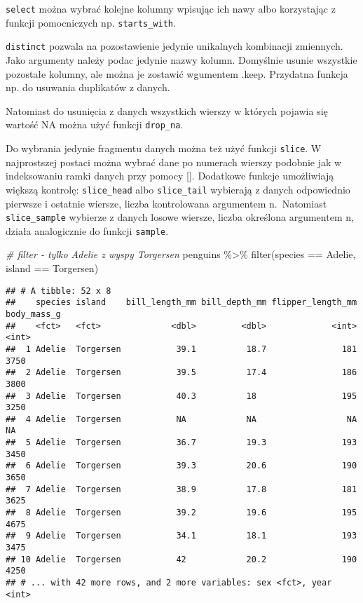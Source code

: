 \documentclass[
]{book}
\newenvironment{Shaded}{\begin{snugshade}}{\end{snugshade}}
\newcommand{\CommentTok}[1]{\textcolor[rgb]{0.56,0.35,0.01}{\textit{#1}}}
\newcommand{\FunctionTok}[1]{\textcolor[rgb]{0.00,0.00,0.00}{#1}}
\newcommand{\NormalTok}[1]{#1}
\newcommand{\SpecialCharTok}[1]{\textcolor[rgb]{0.00,0.00,0.00}{#1}}
\newcommand{\StringTok}[1]{\textcolor[rgb]{0.31,0.60,0.02}{#1}}
\begin{document}
\texttt{select} można wybrać kolejne kolumny wpisując ich nawy albo korzystając z funkcji pomocniczych np. \texttt{starts\_with}.

\texttt{distinct} pozwala na pozostawienie jedynie unikalnych kombinacji zmiennych. Jako argumenty należy podac jedynie nazwy kolumn. Domyślnie usunie wszystkie pozostałe kolumny, ale można je zostawić wgumentem .keep. Przydatna funkcja np. do usuwania duplikatów z danych.

Natomiast do usunięcia z danych wszystkich wierszy w których pojawia się wartość NA można użyć funkcji \texttt{drop\_na}.

Do wybrania jedynie fragmentu danych można też użyć funkcji \texttt{slice}. W najprostszej postaci można wybrać dane po numerach wierszy podobnie jak w indeksowaniu ramki danych przy pomocy {[}{]}. Dodatkowe funkcje umożliwiają większą kontrolę: \texttt{slice\_head} albo \texttt{slice\_tail} wybierają z danych odpowiednio pierwsze i ostatnie wiersze, liczba kontrolowana argumentem n.~Natomiast \texttt{slice\_sample} wybierze z danych losowe wiersze, liczba określona argumentem n, działa analogicznie do funkcji \texttt{sample}.

\begin{Shaded}
\begin{Highlighting}[]
\CommentTok{\# filter {-} tylko Adelie z wyspy Torgersen}
\NormalTok{penguins }\SpecialCharTok{\%\textgreater{}\%} \FunctionTok{filter}\NormalTok{(species }\SpecialCharTok{==} \StringTok{\textquotesingle{}Adelie\textquotesingle{}}\NormalTok{, island }\SpecialCharTok{==} \StringTok{\textquotesingle{}Torgersen\textquotesingle{}}\NormalTok{)}
\end{Highlighting}
\end{Shaded}

\begin{verbatim}
## # A tibble: 52 x 8
##    species island    bill_length_mm bill_depth_mm flipper_length_mm body_mass_g
##    <fct>   <fct>              <dbl>         <dbl>             <int>       <int>
##  1 Adelie  Torgersen           39.1          18.7               181        3750
##  2 Adelie  Torgersen           39.5          17.4               186        3800
##  3 Adelie  Torgersen           40.3          18                 195        3250
##  4 Adelie  Torgersen           NA            NA                  NA          NA
##  5 Adelie  Torgersen           36.7          19.3               193        3450
##  6 Adelie  Torgersen           39.3          20.6               190        3650
##  7 Adelie  Torgersen           38.9          17.8               181        3625
##  8 Adelie  Torgersen           39.2          19.6               195        4675
##  9 Adelie  Torgersen           34.1          18.1               193        3475
## 10 Adelie  Torgersen           42            20.2               190        4250
## # ... with 42 more rows, and 2 more variables: sex <fct>, year <int>
\end{verbatim}
\end{document}
